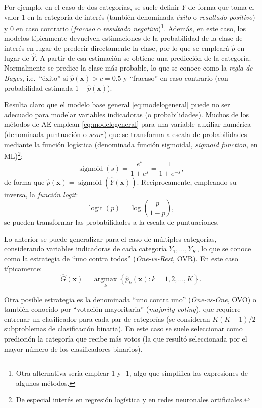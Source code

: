 \documentclass[
  spanish,
]{book}
\theoremstyle{break}
\theoremstyle{definition}
\theoremstyle{definition}
\theoremstyle{definition}
\theoremstyle{definition}
\theoremstyle{remark}
\begin{document}
Por ejemplo, en el caso de dos categorías, se suele definir \(Y\) de forma que toma el valor 1 en la categoría de interés (también denominada \emph{éxito} o \emph{resultado positivo}) y 0 en caso contrario (\emph{fracaso} o \emph{resultado negativo})\footnote{Otra alternativa sería emplear 1 y -1, algo que simplifica las expresiones de algunos métodos.}.
Además, en este caso, los modelos típicamente devuelven estimaciones de la probabilidad de la clase de interés en lugar de predecir directamente la clase, por lo que se empleará \(\hat p\) en lugar de \(\hat Y\).
A partir de esa estimación se obtiene una predicción de la categoría.
Normalmente se predice la clase más probable, lo que se conoce como la \emph{regla de Bayes}, i.e.~``éxito'' si \(\hat p(\mathbf{x}) > c = 0.5\) y ``fracaso'' en caso contrario (con probabilidad estimada \(1 - \hat p(\mathbf{x})\)).

Resulta claro que el modelo base general \eqref{eq:modelogeneral} puede no ser adecuado para modelar variables indicadoras (o probabilidades).
Muchos de los métodos de AE emplean \eqref{eq:modelogeneral} para una variable auxiliar numérica (denominada puntuación o \emph{score}) que se transforma a escala de probabilidades mediante la función logística (denominada función sigmoidal, \emph{sigmoid function}, en ML)\footnote{De especial interés en regresión logística y en redes neuronales artificiales.}:
\[\operatorname{sigmoid}(s) = \frac{e^s}{1 + e^s}= \frac{1}{1 + e^{-s}},\]
de forma que \(\hat p(\mathbf{x}) = \operatorname{sigmoid}(\hat Y(\mathbf{x}))\).
Reciprocamente, empleando su inversa, la \emph{función logit}:
\[\operatorname{logit}(p)=\log\left( \frac{p}{1-p} \right),\]
se pueden transformar las probabilidades a la escala de puntuaciones.

Lo anterior se puede generalizar para el caso de múltiples categorías, considerando variables indicadoras de cada categoría \(Y_1, \ldots, Y_K\), lo que se conoce como la estrategia de ``uno contra todos'' (\emph{One-vs-Rest}, OVR). En este caso típicamente:
\[\hat G \left(\mathbf{x} \right) = \underset{k}{\operatorname{argmax}} \left\{ \hat p_k(\mathbf{x}) : k = 1, 2, \ldots, K \right\}.\]

Otra posible estrategia es la denominada ``uno contra uno'' (\emph{One-vs-One}, OVO) o también conocido por ``votación mayoritaria'' (\emph{majority voting}), que requiere entrenar un clasificador para cada par de categorías (se consideran \(K(K-1)/2\) subproblemas de clasificación binaria).
En este caso se suele seleccionar como predicción la categoría que recibe más votos (la que resultó seleccionada por el mayor número de los clasificadores binarios).
\end{document}
